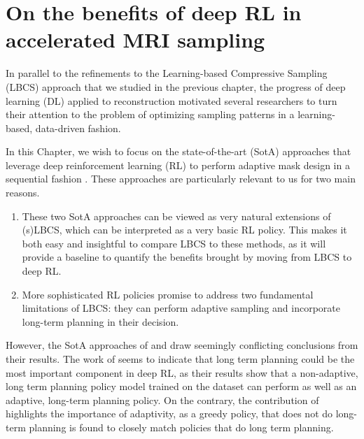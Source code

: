 
\chapter{On the benefits of deep RL in accelerated MRI sampling} \label{ch:rl_mri}

In parallel to the refinements to the Learning-based Compressive Sampling (LBCS) \citep{gozcu2018learning} approach that we studied in the previous chapter, the progress of deep learning (DL) applied to reconstruction motivated several researchers to turn their attention to the problem of optimizing sampling patterns in a learning-based, data-driven fashion.

In this Chapter, we wish to focus on the state-of-the-art (SotA) approaches that leverage deep reinforcement learning (RL) to perform adaptive mask design in a sequential fashion \citep{bakker2020experimental,pineda2020active}. These approaches are particularly relevant to us for two main reasons.
\begin{enumerate}
    \item These two SotA approaches can be viewed as very natural extensions of (s)LBCS, which can be interpreted as a very basic RL policy. %
    This makes it both easy and insightful to compare LBCS to these methods, as it will provide a baseline to quantify the benefits brought by moving from LBCS to deep RL.
    \item More sophisticated RL policies promise to address two fundamental limitations of LBCS: they can perform adaptive sampling and incorporate long-term planning in their decision.
\end{enumerate}  

However, the SotA approaches of \citet{pineda2020active} and \citet{bakker2020experimental} draw seemingly conflicting conclusions from their results. The work of \citet{pineda2020active} seems to indicate that long term planning could be the most important component in deep RL, as their results show that a non-adaptive, long term planning policy model trained on the dataset can perform as well as an adaptive, long-term planning policy. On the contrary, the contribution of \citet{bakker2020experimental} highlights the importance of adaptivity, as a greedy policy, that does not do long-term planning is found to closely match policies that do long term planning.

